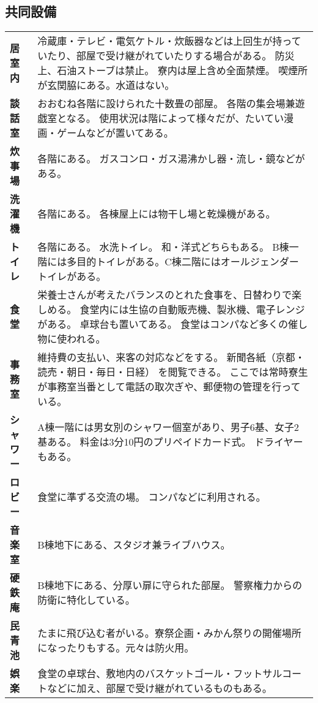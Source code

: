 		\subsection{共同設備}

    \renewcommand{\arraystretch}{1.3}
    \begin{table}[htbp]
      \begin{tabular}{lp{}}
        
        \textbf{居室内}  & 冷蔵庫・テレビ・電気ケトル・炊飯器などは上回生が持っていたり、部屋で受け継がれていたりする場合がある。 防災上、石油ストーブは禁止。 寮内は屋上含め全面禁煙。 喫煙所が玄関脇にある。水道はない。 \\  
        \textbf{談話室}  & おおむね各階に設けられた十数畳の部屋。 各階の集会場兼遊戯室となる。 使用状況は階によって様々だが、たいてい漫画・ゲームなどが置いてある。     \\ 
        \textbf{炊事場}  & 各階にある。 ガスコンロ・ガス湯沸かし器・流し・鏡などがある。                                                           \\ 
        \textbf{洗濯機}  & 各階にある。 各棟屋上には物干し場と乾燥機がある。                                                                   \\ 
        \textbf{トイレ}  & 各階にある。 水洗トイレ。 和・洋式どちらもある。 B棟一階には多目的トイレがある。C棟二階にはオールジェンダートイレがある。                             \\ 
        \textbf{食堂}   & 栄養士さんが考えたバランスのとれた食事を、日替わりで楽しめる。 食堂内には生協の自動販売機、製氷機、電子レンジがある。 卓球台も置いてある。 食堂はコンパなど多くの催し物に使われる。    \\ 
        \textbf{事務室}  & 維持費の支払い、来客の対応などをする。 新聞各紙（京都・読売・朝日・毎日・日経） を閲覧できる。 ここでは常時寮生が事務室当番として電話の取次ぎや、郵便物の管理を行っている。     \\ 
        \textbf{シャワー} & A棟一階には男女別のシャワー個室があり、男子6基、女子2基ある。 料金は3分10円のプリペイドカード式。 ドライヤーもある。                              \\ 
        \textbf{ロビー}  & 食堂に準ずる交流の場。 コンパなどに利用される。                                                                    \\ 
        \textbf{音楽室}  & B棟地下にある、スタジオ兼ライブハウス。                                                                        \\ 
        \textbf{硬鉄庵}  & B棟地下にある、分厚い扉に守られた部屋。 警察権力からの防衛に特化している。                                                      \\ 
        \textbf{民青池}  & たまに飛び込む者がいる。寮祭企画・みかん祭りの開催場所になったりもする。元々は防火用。   \\ 
        \textbf{娯楽}   & 食堂の卓球台、敷地内のバスケットゴール・フットサルコートなどに加え、部屋で受け継がれているものもある。        \\                                 
    \end{tabular}
  \end{table}

